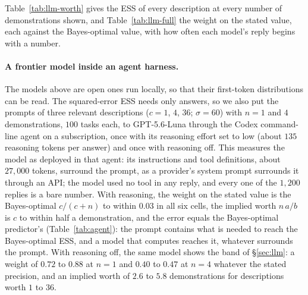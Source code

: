 \documentclass{article}
\begin{document}
Table~\ref{tab:llm-worth} gives the ESS of every description at every number of demonstrations shown, and Table~\ref{tab:llm-full} the weight on the stated value, each against the Bayes-optimal value, with how often each model's reply begins with a number.

\begin{table}[t]
\centering\scriptsize
\setlength{\tabcolsep}{1.2pt}
\caption{ESS of a description, model/Bayes-optimal, for every condition and number of demonstrations shown ($2{,}000$ tasks). ``Number'' is the share of replies that begin with a three-digit number, averaged over $n$; a cell is in italics where that share is below three quarters at that $n$. Rel./irrel.: a relevant or irrelevant description; w.: a stated chance of being wrong. Rel.\ and irrel.: a relevant or an irrelevant description; w.: a stated chance of being wrong. $> 64$: the model's error with the description is below its error with $64$ demonstrations and no description.}
\label{tab:llm-worth}
\vspace{3pt}

\end{table}

\paragraph{A frontier model inside an agent harness.} The models above are open ones run locally, so that their first-token distributions can be read. The squared-error ESS needs only answers, so we also put the prompts of three relevant descriptions ($c = 1$, $4$, $36$; $\sigma = 60$) with $n = 1$ and $4$ demonstrations, $100$ tasks each, to GPT-5.6-Luna through the Codex command-line agent on a subscription, once with its reasoning effort set to low (about $135$ reasoning tokens per answer) and once with reasoning off. This measures the model as deployed in that agent: its instructions and tool definitions, about $27{,}000$ tokens, surround the prompt, as a provider's system prompt surrounds it through an API; the model used no tool in any reply, and every one of the $1{,}200$ replies is a bare number. With reasoning, the weight on the stated value is the Bayes-optimal $c/(c+n)$ to within $0.03$ in all six cells, the implied worth $n\,a/b$ is $c$ to within half a demonstration, and the error equals the Bayes-optimal predictor's (Table~\ref{tab:agent}): the prompt contains what is needed to reach the Bayes-optimal ESS, and a model that computes reaches it, whatever surrounds the prompt. With reasoning off, the same model shows the band of \S\ref{sec:llm}: a weight of $0.72$ to $0.88$ at $n = 1$ and $0.40$ to $0.47$ at $n = 4$ whatever the stated precision, and an implied worth of $2.6$ to $5.8$ demonstrations for descriptions worth $1$ to $36$.
\end{document}
